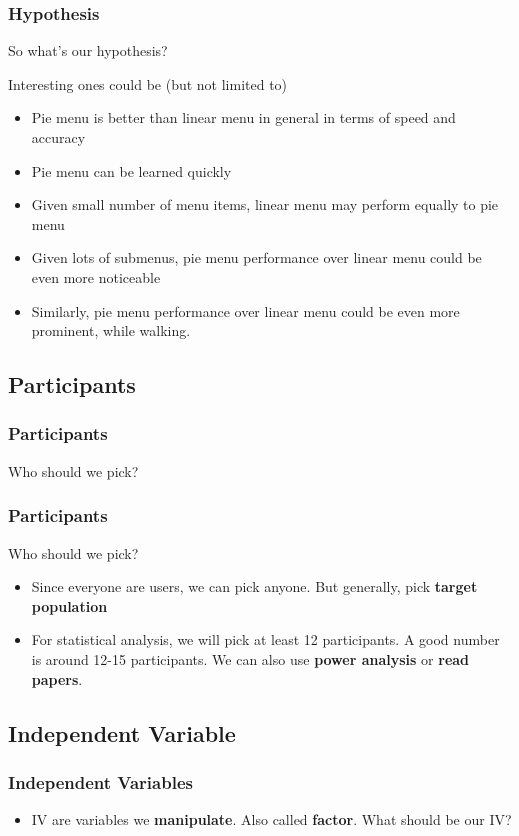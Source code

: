 \documentclass{beamer}
\begin{document}
\begin{frame}
\frametitle{Hypothesis}

So what's our hypothesis?

Interesting ones could be (but not limited to)

\begin{itemize}
	\item Pie menu is better than linear menu in general in terms of speed and accuracy
	\item Pie menu can be learned quickly
	\item Given small number of menu items, linear menu may perform equally to pie menu
	\item Given lots of submenus,  pie menu performance over linear menu could be even more noticeable
	\item Similarly,  pie menu performance over linear menu could be even more prominent, while walking.
\end{itemize}

\end{frame}

\subsection{Participants}

\begin{frame}
	\frametitle{Participants}
	Who should we pick?
\end{frame}

\begin{frame}
	\frametitle{Participants}
	Who should we pick?
	\begin{itemize}
		\item  Since everyone are users, we can pick anyone.  But generally, pick \textbf{target population}
		\item For statistical analysis, we will pick at least 12 participants.  A good number is around 12-15 participants.   We can also use \textbf{power analysis} or \textbf{read papers}.
	\end{itemize}
\end{frame}

\subsection{Independent Variable}

\begin{frame}
\frametitle{Independent Variables}
\begin{itemize}
	\item IV are variables we \textbf{manipulate}.  Also called \textbf{factor}. What should be our IV? 
\end{itemize}
\end{frame}
\end{document}
